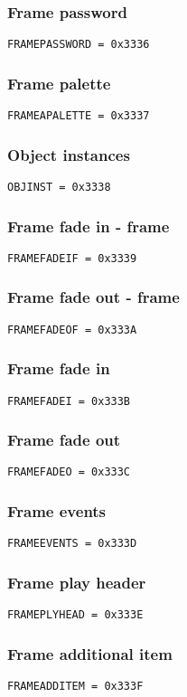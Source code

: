 \documentclass{article}
\begin{document}
\subsubsection{Frame password}
\verb|FRAMEPASSWORD = 0x3336|

\subsubsection{Frame palette}
\verb|FRAMEAPALETTE = 0x3337|

\subsubsection{Object instances}
\verb|OBJINST = 0x3338|

\subsubsection{Frame fade in - frame}
\verb|FRAMEFADEIF = 0x3339|

\subsubsection{Frame fade out - frame}
\verb|FRAMEFADEOF = 0x333A|

\subsubsection{Frame fade in}
\verb|FRAMEFADEI = 0x333B|

\subsubsection{Frame fade out}
\verb|FRAMEFADEO = 0x333C|

\subsubsection{Frame events}
\verb|FRAMEEVENTS = 0x333D|

\subsubsection{Frame play header}
\verb|FRAMEPLYHEAD = 0x333E|

\subsubsection{Frame additional item}
\verb|FRAMEADDITEM = 0x333F|
\end{document}
